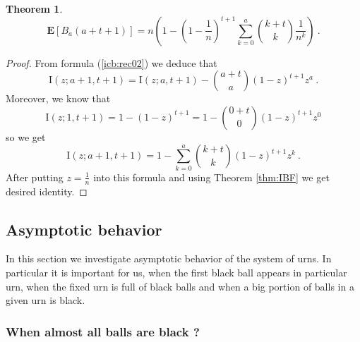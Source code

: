 \documentclass[submission]{dmtcs}
\newtheorem{theorem}{Theorem}
\newcommand{\E}[1]{\mathbf{E}\left[#1\right]}
\newcommand{\IBETAREG}[3]{\mathrm{I}\left(#1;#2,#3\right)}
\newcommand{\IBETAREGn}[2]{\mathrm{I}\left(\frac1n;#1,#2\right)}
\newcommand{\BigO}[1]{\mathrm{O}\left(#1\right)}
\begin{document}
\begin{theorem}
\label{thm:goodformula}
\begin{equation}
\label{eq:ya}
  \E{B_{a}(a+t+1)} =  
  n\left(1- \left(1-\frac{1}{n}\right)^{t+1} \sum_{k=0}^{a} \binom{k+t}{k}\frac{1}{n^k}\right)~.
  \end{equation}
\end{theorem} 

\begin{proof}
From formula (\ref{icb:rec02}) we deduce that
$$
  \IBETAREG{z}{a+1}{t+1} = 
	\IBETAREG{z}{a}{t+1} - \binom{a+t}{a} (1-z)^{t+1} z^a ~.
$$
Moreover, we know that 
$$
\IBETAREG{z}{1}{t+1}  = 1 - (1-z)^{t+1} = 
  1 - \binom{0+t}{0} (1-z)^{t+1} z^0
$$
so we get
$$
  \IBETAREG{z}{a+1}{t+1} = 1 - 
	\sum_{k=0}^{a} \binom{k+t}{k}(1-z)^{t+1}z^k~.
$$
After putting $z= \frac1n$ into this formula and using Theorem \ref{thm:IBF}
we get desired identity.
\end{proof}


\subsection{Asymptotic behavior}

In this section we investigate asymptotic behavior of the system of urns. 
In particular it is important for us, when the first black ball appears in particular 
urn, when the fixed urn is full of black balls and when a big portion of balls in a given
urn is black.  


\subsubsection{When almost all balls are black ?}
\end{document}
